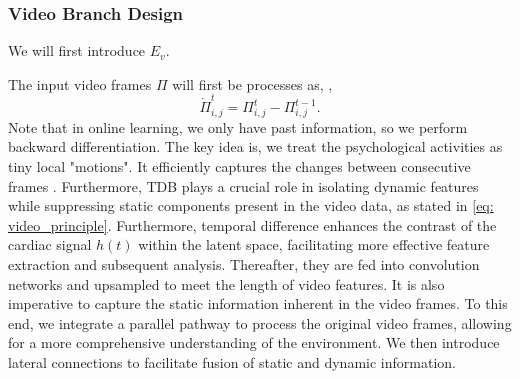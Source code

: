 \subsubsection{Video Branch Design}
We will first introduce $E_v$.

 The input video frames $\Pi$  will first be processes as, \ie,
\begin{equation}
    \dot{\Pi}_{i,j}^{t}=\Pi_{i,j}^t - \Pi_{i,j}^{t-1}.
\end{equation}
Note that in online learning, we only have past information, so we perform backward differentiation. The key idea is, we treat the psychological activities as tiny local "motions". It efficiently captures the changes between consecutive frames \cite{wang2021tdn}. Furthermore, TDB plays a crucial role in isolating dynamic features while suppressing static components present in the video data, as stated in \eqn\eqref{eq: video_principle}. 
Furthermore, temporal difference enhances the contrast of the cardiac signal $h(t)$ within the latent space, facilitating more effective feature extraction and subsequent analysis. 
Thereafter, they are fed into convolution networks and upsampled to meet the length of video features. It is also imperative to capture the static information inherent in the video frames. To this end, we integrate a parallel pathway to process the original video frames, allowing for a more comprehensive understanding of the environment. We then introduce lateral connections to facilitate fusion of static and dynamic information.



